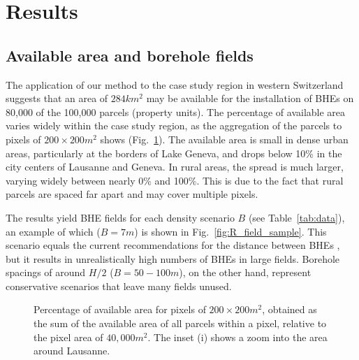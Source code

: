 \section{Results}
\label{results}

\subsection{Available area and borehole fields}

The application of our method to the case study region in western Switzerland suggests that an area of $284 km^2$ may be available for the installation of BHEs on 80,000 of the 100,000 parcels (property units).
The percentage of available area varies widely within the case study region, as the aggregation of the parcels to pixels of $200 \times 200 m^2$ shows (Fig.~\ref{fig:avail_area}).
The available area is small in dense urban areas, particularly at the borders of Lake Geneva, and drops below 10\% in the city centers of Lausanne and Geneva. 
In rural areas, the spread is much larger, varying widely between nearly 0\% and 100\%. 
This is due to the fact that rural parcels are spaced far apart and may cover multiple pixels. 

The results yield BHE fields for each density scenario $B$ (see Table~\ref{tab:data}), an example of which ($B = 7m$) is shown in Fig.~\ref{fig:R_field_sample}.
This scenario equals the current recommendations for the distance between BHEs \cite{miglani_methodology_2018}, but it results in unrealistically high numbers of BHEs in large fields. 
Borehole spacings of around $H/2$ ($B=50-100m$), on the other hand, represent conservative scenarios that leave many fields unused. 

\begin{figure}[tb]
\centering
{}
\caption{Percentage of available area for pixels of $200 \times 200m^2$, obtained as the sum of the available area of all parcels within a pixel, relative to the pixel area of $40,000 m^2$. The inset (i) shows a zoom into the area around Lausanne.}
\label{fig:avail_area}
\end{figure}

